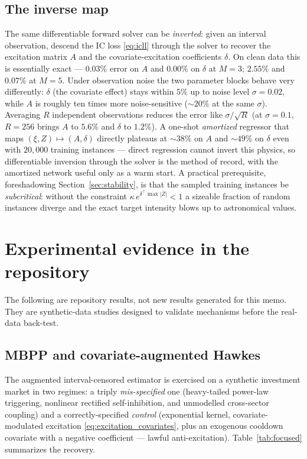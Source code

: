 \documentclass[11pt]{article}
\theoremstyle{plain}
\theoremstyle{definition}
\theoremstyle{remark}
\begin{document}
\subsection{The inverse map}
The same differentiable forward solver can be \emph{inverted}: given an interval observation, descend the IC loss \eqref{eq:icll} through the solver to recover the excitation matrix $A$ and the covariate-excitation coefficients $\delta$. On clean data this is essentially exact --- $0.03\%$ error on $A$ and $0.00\%$ on $\delta$ at $M=3$; $2.55\%$ and $0.07\%$ at $M=5$. Under observation noise the two parameter blocks behave very differently: $\delta$ (the covariate effect) stays within $5\%$ up to noise level $\sigma=0.02$, while $A$ is roughly ten times more noise-sensitive ($\sim\!20\%$ at the same $\sigma$). Averaging $R$ independent observations reduces the error like $\sigma/\sqrt{R}$ (at $\sigma=0.1$, $R=256$ brings $A$ to $5.6\%$ and $\delta$ to $1.2\%$). A one-shot \emph{amortized} regressor that maps $(\xi,Z)\mapsto(A,\delta)$ directly plateaus at $\sim\!38\%$ on $A$ and $\sim\!49\%$ on $\delta$ even with $20{,}000$ training instances --- direct regression cannot invert this physics, so differentiable inversion through the solver is the method of record, with the amortized network useful only as a warm start. A practical prerequisite, foreshadowing Section~\ref{sec:stability}, is that the sampled training instances be \emph{subcritical}: without the constraint $\kappa\,e^{\delta^\top\max|Z|}<1$ a sizeable fraction of random instances diverge and the exact target intensity blows up to astronomical values.

\section{Experimental evidence in the repository}
\label{sec:results}

The following are repository results, not new results generated for this memo. They are synthetic-data studies designed to validate mechanisms before the real-data back-test.

\subsection{MBPP and covariate-augmented Hawkes}
The augmented interval-censored estimator is exercised on a synthetic investment market in two regimes: a triply \emph{mis-specified} one (heavy-tailed power-law triggering, nonlinear rectified self-inhibition, and unmodelled cross-sector coupling) and a correctly-specified \emph{control} (exponential kernel, covariate-modulated excitation \eqref{eq:excitation_covariates}, plus an exogenous cooldown covariate with a negative coefficient --- lawful anti-excitation). Table~\ref{tab:focused} summarizes the recovery.
\end{document}
